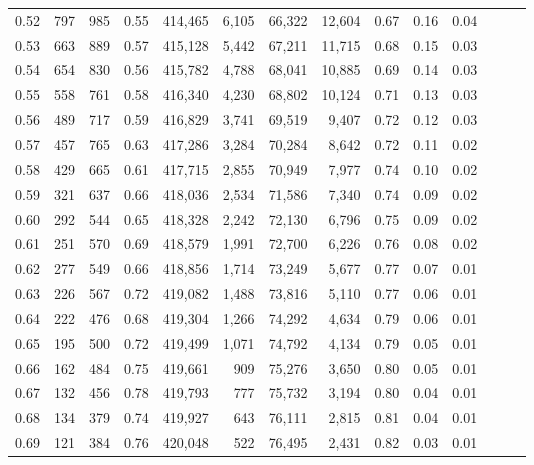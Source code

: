 \begin{tabular}{rrrrrrrrrrrrrr}
0.52 &     797 &    985 &  0.55 &  414,465 &    6,105 &  66,322 &  12,604 &  0.67 &  0.16 &      0.04 \\
0.53 &     663 &    889 &  0.57 &  415,128 &    5,442 &  67,211 &  11,715 &  0.68 &  0.15 &      0.03 \\
0.54 &     654 &    830 &  0.56 &  415,782 &    4,788 &  68,041 &  10,885 &  0.69 &  0.14 &      0.03 \\
0.55 &     558 &    761 &  0.58 &  416,340 &    4,230 &  68,802 &  10,124 &  0.71 &  0.13 &      0.03 \\
0.56 &     489 &    717 &  0.59 &  416,829 &    3,741 &  69,519 &   9,407 &  0.72 &  0.12 &      0.03 \\
0.57 &     457 &    765 &  0.63 &  417,286 &    3,284 &  70,284 &   8,642 &  0.72 &  0.11 &      0.02 \\
0.58 &     429 &    665 &  0.61 &  417,715 &    2,855 &  70,949 &   7,977 &  0.74 &  0.10 &      0.02 \\
0.59 &     321 &    637 &  0.66 &  418,036 &    2,534 &  71,586 &   7,340 &  0.74 &  0.09 &      0.02 \\
0.60 &     292 &    544 &  0.65 &  418,328 &    2,242 &  72,130 &   6,796 &  0.75 &  0.09 &      0.02 \\
0.61 &     251 &    570 &  0.69 &  418,579 &    1,991 &  72,700 &   6,226 &  0.76 &  0.08 &      0.02 \\
0.62 &     277 &    549 &  0.66 &  418,856 &    1,714 &  73,249 &   5,677 &  0.77 &  0.07 &      0.01 \\
0.63 &     226 &    567 &  0.72 &  419,082 &    1,488 &  73,816 &   5,110 &  0.77 &  0.06 &      0.01 \\
0.64 &     222 &    476 &  0.68 &  419,304 &    1,266 &  74,292 &   4,634 &  0.79 &  0.06 &      0.01 \\
0.65 &     195 &    500 &  0.72 &  419,499 &    1,071 &  74,792 &   4,134 &  0.79 &  0.05 &      0.01 \\
0.66 &     162 &    484 &  0.75 &  419,661 &      909 &  75,276 &   3,650 &  0.80 &  0.05 &      0.01 \\
0.67 &     132 &    456 &  0.78 &  419,793 &      777 &  75,732 &   3,194 &  0.80 &  0.04 &      0.01 \\
0.68 &     134 &    379 &  0.74 &  419,927 &      643 &  76,111 &   2,815 &  0.81 &  0.04 &      0.01 \\
0.69 &     121 &    384 &  0.76 &  420,048 &      522 &  76,495 &   2,431 &  0.82 &  0.03 &      0.01 \\

\end{tabular}
